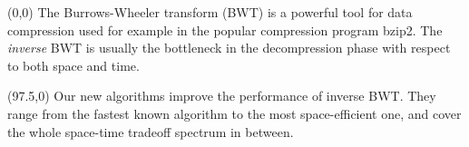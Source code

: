 \documentclass[a4paper]{article} %
\begin{document}
\begin{textblock}{92.5}(0,0)
\sffamily
\small 
The Burrows-Wheeler transform (BWT) is a powerful tool for data
compression used for example in the popular compression program
bzip2. The \emph{inverse} BWT is usually the bottleneck in the
decompression phase with respect to both space and time.
\end{textblock}
\begin{textblock}{92.5}(97.5,0) 
  \sffamily \small 
  Our new algorithms improve the performance of inverse BWT.  They
  range from the fastest known algorithm to the most space-efficient
  one, and cover the whole space-time tradeoff spectrum in between.
\end{textblock}


%
\end{document}
